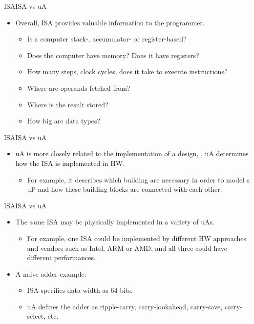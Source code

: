 \documentclass[]{slides}
\begin{document}
\begin{frame}{\acl{ISA}}{\acs{ISA} vs \acs{uA}}
\begin{itemize}
  \item Overall, \ac{ISA} provides valuable information to the programmer.
  \begin{itemize}
  	\item Is a computer stack-, accumulator- or register-based?
  	\item Does the computer have memory? Does it have registers?
  	\item How many steps, \ie clock cycles, does it take to execute instructions?
  	\item Where are operands fetched from?
  	\item Where is the result stored?
  	\item How big are data types?
  \end{itemize}
\end{itemize}
\end{frame}


\begin{frame}{\acl{ISA}}{\acs{ISA} vs \acs{uA}}
\begin{itemize}
  \item \ac{uA} is more closely related to the  implementation of a design, \ie, \ac{uA} determines how the \ac{ISA} is implemented in \ac{HW}.
  \begin{itemize}
    \item For example, it describes which building are necessary in order to model a \ac{uP} and how these building blocks are connected with each other. 
  \end{itemize}
\end{itemize}
\end{frame}

\begin{frame}{\acl{ISA}}{\acs{ISA} vs \acs{uA}}
\begin{itemize}
  \item The same \ac{ISA} may be physically implemented in a variety of \acp{uA}.
  \begin{itemize}
  	\item For example, one \ac{ISA} could be implemented by different \ac{HW} approaches and vendors such as Intel, ARM or AMD, and all three could have different performances.  
  \end{itemize}
  \item A naive adder example: 
  	\begin{itemize}
  	\item \ac{ISA} specifies data width as 64-bits. 
  	\item \ac{uA} defines the adder as ripple-carry, carry-lookahead, carry-save, carry-select, etc.
  	\end{itemize}
\end{itemize}
\end{frame}
\end{document}
